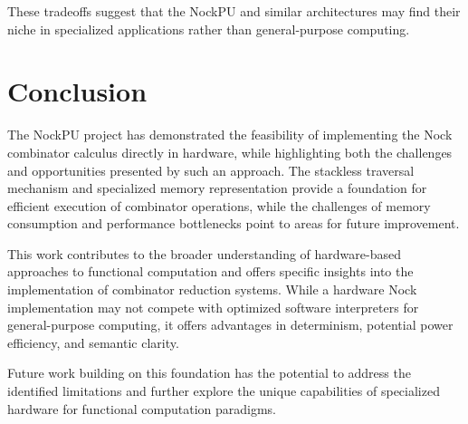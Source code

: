 \documentclass[twoside]{article}
\begin{document}
\noindent
These tradeoffs suggest that the NockPU and similar architectures may find their niche in specialized applications rather than general-purpose computing.

\section{Conclusion}

The NockPU project has demonstrated the feasibility of implementing the Nock combinator calculus directly in hardware, while highlighting both the challenges and opportunities presented by such an approach. The stackless traversal mechanism and specialized memory representation provide a foundation for efficient execution of combinator operations, while the challenges of memory consumption and performance bottlenecks point to areas for future improvement.

This work contributes to the broader understanding of hardware-based approaches to functional computation and offers specific insights into the implementation of combinator reduction systems. While a hardware Nock implementation may not compete with optimized software interpreters for general-purpose computing, it offers advantages in determinism, potential power efficiency, and semantic clarity.

Future work building on this foundation has the potential to address the identified limitations and further explore the unique capabilities of specialized hardware for functional computation paradigms.

\printbibliography
\end{document}
